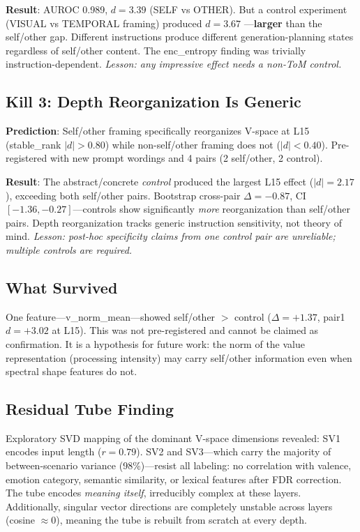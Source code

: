 \documentclass[11pt,letterpaper]{article}
\begin{document}
\textbf{Result}: AUROC 0.989, $d = 3.39$ (SELF vs OTHER). But a
control experiment (VISUAL vs TEMPORAL framing) produced $d = 3.67$
---\textbf{larger} than the self/other gap. Different instructions
produce different generation-planning states regardless of self/other
content. The enc\_entropy finding was trivially instruction-dependent.
\textit{Lesson: any impressive effect needs a non-ToM control.}

\subsection{Kill 3: Depth Reorganization Is Generic}

\textbf{Prediction}: Self/other framing specifically reorganizes
V-space at L15 (stable\_rank $|d| > 0.80$) while non-self/other
framing does not ($|d| < 0.40$). Pre-registered with new prompt
wordings and 4 pairs (2 self/other, 2 control).

\textbf{Result}: The abstract/concrete \emph{control} produced the
largest L15 effect ($|d| = 2.17$), exceeding both self/other pairs.
Bootstrap cross-pair $\Delta = -0.87$, CI $[-1.36, -0.27]$---controls
show significantly \emph{more} reorganization than self/other pairs.
Depth reorganization tracks generic instruction sensitivity, not
theory of mind. \textit{Lesson: post-hoc specificity claims from one
control pair are unreliable; multiple controls are required.}

\subsection{What Survived}

One feature---v\_norm\_mean---showed self/other $>$ control
($\Delta = +1.37$, pair1 $d = +3.02$ at L15). This was not
pre-registered and cannot be claimed as confirmation. It is a
hypothesis for future work: the norm of the value representation
(processing intensity) may carry self/other information even when
spectral shape features do not.

\subsection{Residual Tube Finding}

Exploratory SVD mapping of the dominant V-space dimensions revealed:
SV1 encodes input length ($r = 0.79$). SV2 and SV3---which carry
the majority of between-scenario variance (98\%)---resist all
labeling: no correlation with valence, emotion category, semantic
similarity, or lexical features after FDR correction. The tube
encodes \emph{meaning itself}, irreducibly complex at these layers.
Additionally, singular vector directions are completely unstable
across layers (cosine $\approx 0$), meaning the tube is rebuilt
from scratch at every depth.
\end{document}
